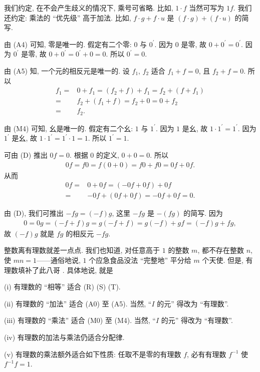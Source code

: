 我们约定, 在不会产生歧义的情况下, 乘号可省略. 比如, $1 \cdot f$ 当然可写为 $1f$. 我们还约定: 乘法的 ``优先级'' 高于加法. 比如, $f \cdot g + f \cdot u$ 是 $(f \cdot g) + (f \cdot u)$ 的简写.

由 (A4) 可知, 零是唯一的. 假定有二个零: $0$ 与 $0^{\prime}$. 因为 $0$ 是零, 故 $0 + 0^{\prime} = 0^{\prime}$. 因为 $0^{\prime}$ 是零, 故 $0 + 0^{\prime} = 0^{\prime} + 0 = 0$. 所以 $0^{\prime} = 0$.

由 (A5) 知, 一个元的相反元是唯一的. 设 $f_1$, $f_2$ 适合 $f_1 + f = 0$, 且 $f_2 + f = 0$. 所以
\begin{align*}
    f_1
    = {} & 0 + f_1 = (f_2 + f) + f_1 = f_2 + (f + f_1) \\
    = {} & f_2 + (f_1 + f) = f_2 + 0 = 0 + f_2         \\
    = {} & f_2.
\end{align*}

由 (M4) 可知, 幺是唯一的. 假定有二个幺: $1$ 与 $1^{\prime}$. 因为 $1$ 是幺, 故 $1 \cdot 1^{\prime} = 1^{\prime}$. 因为 $1^{\prime}$ 是幺, 故 $1 \cdot 1^{\prime} = 1^{\prime} \cdot 1 = 1$. 所以 $1^{\prime} = 1$.

可由 (D) 推出 $0f = 0$. 根据 $0$ 的定义, $0 + 0 = 0$. 所以
\begin{align*}
    0f = f0 = f(0 + 0) = f0 + f0 = 0f + 0f.
\end{align*}
从而
\begin{align*}
    0f
    = {} & 0 + 0f = (-0f + 0f) + 0f          \\
    = {} & {-0f} + (0f + 0f) = -0f + 0f = 0.
\end{align*}

由 (D), 我们可推出 $-fg = (-f)g$, 这里 $-fg$ 是 $-(fg)$ 的简写. 因为
\begin{align*}
    0 = 0g = (-f + f)g = g(-f + f) = g(-f) + gf = (-f)g + fg,
\end{align*}
故 $(-f)g$ 就是 $fg$ 的相反元 $-fg$.

整数离有理数就差一点点. 我们也知道, 对任意高于 $1$ 的整数 $m$, 都不存在整数 $n$, 使 $mn = 1$——通俗地说, $1$ 个应急食品没法 ``完整地'' 平分给 $m$ 个天使. 但是, 有理数填补了此八哥 . 具体地说, 就是
\begin{proposition}
    (i) 有理数的 ``相等'' 适合 (R) (S) (T).

    (ii) 有理数的 ``加法'' 适合 (A0) 至 (A5). 当然, ``$I$ 的元'' 得改为 ``有理数''.

    (iii) 有理数的 ``乘法'' 适合 (M0) 至 (M4). 当然, ``$I$ 的元'' 得改为 ``有理数''.

    (iv) 有理数的加法与乘法仍适合分配律.

    (v) 有理数的乘法额外适合如下性质: 任取不是零的有理数 $f$, 必有有理数 $f^{-1}$ 使 $f^{-1} f = 1$.
\end{proposition}

